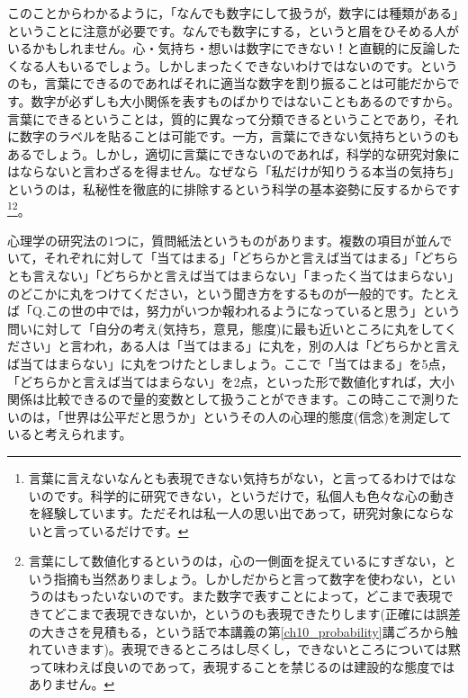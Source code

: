\documentclass{ltjsbook}
\begin{document}
このことからわかるように，「なんでも数字にして扱うが，数字には種類がある」ということに注意が必要です。なんでも数字にする，というと眉をひそめる人がいるかもしれません。心・気持ち・想いは数字にできない！と直観的に反論したくなる人もいるでしょう。しかしまったくできないわけではないのです。というのも，言葉にできるのであればそれに適当な数字を割り振ることは可能だからです。数字が必ずしも大小関係を表すものばかりではないこともあるのですから。言葉にできるということは，質的に異なって分類できるということであり，それに数字のラベルを貼ることは可能です。一方，言葉にできない気持ちというのもあるでしょう。しかし，適切に言葉にできないのであれば，科学的な研究対象にはならないと言わざるを得ません。なぜなら「私だけが知りうる本当の気持ち」というのは，私秘性を徹底的に排除するという科学の基本姿勢に反するからです\footnote{言葉に言えないなんとも表現できない気持ちがない，と言ってるわけではないのです。科学的に研究できない，というだけで，私個人も色々な心の動きを経験しています。ただそれは私一人の思い出であって，研究対象にならないと言っているだけです。}\footnote{言葉にして数値化するというのは，心の一側面を捉えているにすぎない，という指摘も当然ありましょう。しかしだからと言って数字を使わない，というのはもったいないのです。また数字で表すことによって，どこまで表現できてどこまで表現できないか，というのも表現できたりします(正確には誤差の大きさを見積もる，という話で本講義の第\ref{ch10_probability}講ごろから触れていきます)。表現できるところはし尽くし，できないところについては黙って味わえば良いのであって，表現することを禁じるのは建設的な態度ではありません。}。

心理学の研究法の1つに，質問紙法というものがあります。複数の項目が並んでいて，それぞれに対して「当てはまる」「どちらかと言えば当てはまる」「どちらとも言えない」「どちらかと言えば当てはまらない」「まったく当てはまらない」のどこかに丸をつけてください，という聞き方をするものが一般的です。たとえば「Q.この世の中では，努力がいつか報われるようになっていると思う」という問いに対して「自分の考え(気持ち，意見，態度)に最も近いところに丸をしてください」と言われ，ある人は「当てはまる」に丸を，別の人は「どちらかと言えば当てはまらない」に丸をつけたとしましょう。ここで「当てはまる」を5点，「どちらかと言えば当てはまらない」を2点，といった形で数値化すれば，大小関係は比較できるので量的変数として扱うことができます。この時ここで測りたいのは，「世界は公平だと思うか」というその人の心理的態度(信念)を測定していると考えられます。
\end{document}
